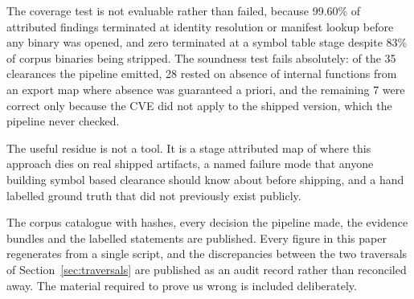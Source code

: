 The coverage test is not evaluable rather than failed, because 99.60\% of
attributed findings terminated at identity resolution or manifest lookup before
any binary was opened, and zero terminated at a symbol table stage despite 83\%
of corpus binaries being stripped. The soundness test fails absolutely: of the 35
clearances the pipeline emitted, 28 rested on absence of internal functions from
an export map where absence was guaranteed a priori, and the remaining 7 were
correct only because the CVE did not apply to the shipped version, which the
pipeline never checked.

The useful residue is not a tool. It is a stage attributed map of where this
approach dies on real shipped artifacts, a named failure mode that anyone
building symbol based clearance should know about before shipping, and a hand
labelled ground truth that did not previously exist publicly.

The corpus catalogue with hashes, every decision the pipeline made, the evidence
bundles and the labelled statements are published. Every figure in this paper
regenerates from a single script, and the discrepancies between the two
traversals of Section~\ref{sec:traversals} are published as an audit record
rather than reconciled away. The material required to prove us wrong is included
deliberately.
